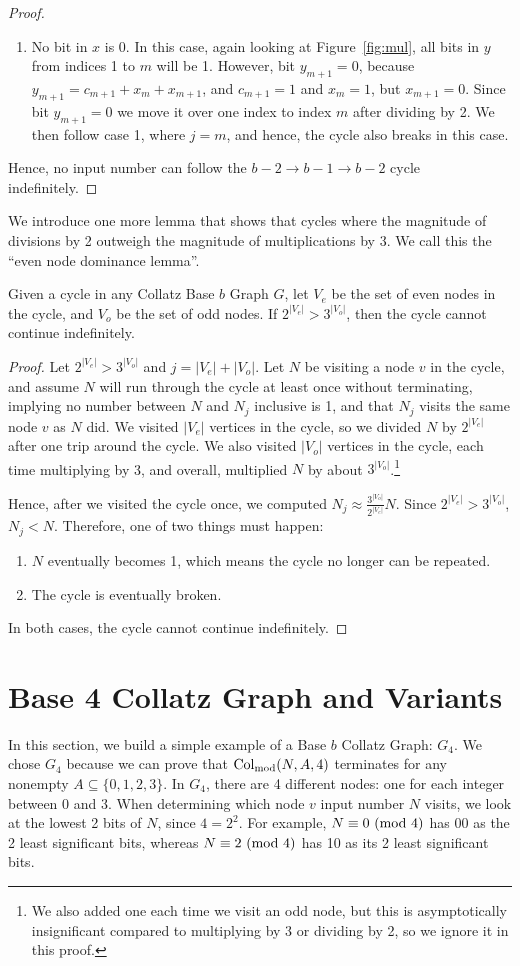 \begin{proof}
\begin{enumerate}
    \item No bit in $x$ is 0. In this case, again looking at Figure~\ref{fig:mul}, all bits in $y$ from indices 1 to $m$ will be 1. However, bit $y_{m+1} = 0$, because $y_{m+1} = c_{m+1} + x_{m} + x_{m+1}$, and $c_{m+1} = 1$ and $x_{m} = 1$, but $x_{m+1} = 0$. Since bit $y_{m+1} = 0$ we move it over one index to index $m$ after dividing by 2. We then follow case 1, where $j = m$, and hence, the cycle also breaks in this case.
 \end{enumerate}
 Hence, no input number can follow the $b-2 \rightarrow b-1 \rightarrow b-2$ cycle indefinitely. 
\end{proof}
We introduce one more lemma that shows that cycles where the magnitude of divisions by 2 outweigh the magnitude of multiplications by 3. We call this the ``even node dominance lemma''.
\begin{lemma}
\label{lem:EvenDom}
Given a cycle in any Collatz Base $b$ Graph $G$, let $V_{e}$ be the set of even nodes in the cycle, and $V_{o}$ be the set of odd nodes. If $2^{|V_e|} > 3^{|V_o|}$, then the cycle cannot continue indefinitely.
\end{lemma}
\begin{proof}
Let $2^{|V_e|} > 3^{|V_o|}$ and $j=|V_e| + |V_o|$. Let $N$ be visiting a node $v$ in the cycle, and assume $N$ will run through the cycle at least once without terminating, implying no number between $N$ and $N_j$ inclusive is 1, and that $N_j$ visits the same node $v$ as $N$ did. We visited $|V_e|$ vertices in the cycle, so we divided $N$ by $2^{|V_e|}$ after one trip around the cycle. We also visited $|V_o|$ vertices in the cycle, each time multiplying by 3, and overall, multiplied $N$ by about $3^{|V_o|}$.\footnote{We also added one each time we visit an odd node, but this is asymptotically insignificant compared to multiplying by 3 or dividing by 2, so we ignore it in this proof.}\par
Hence, after we visited the cycle once, we computed $N_{j} \approx \frac{3^{|V_o|}}{2^{|V_e|}}N$. Since $2^{|V_e|} > 3^{|V_o|}$, $N_{j} < N$. Therefore, one of two things must happen:
\begin{enumerate}
\item $N$ eventually becomes 1, which means the cycle no longer can be repeated.
\item The cycle is eventually broken.
\end{enumerate}
In both cases, the cycle cannot continue indefinitely.
\end{proof}
\section{Base 4 Collatz Graph and Variants} \label{subsec:base4graph}
In this section, we build a simple example of a Base $b$ Collatz Graph:  $G_4$. We chose $G_4$ because we can prove that $\mathrm{Col}_{\text{mod}}(N,A,4)$ terminates for any nonempty $A \subseteq \{0,1,2,3\}$. In $G_4$, there are 4 different nodes: one for each integer between 0 and 3. When determining which node $v$ input number $N$ visits, we look at the lowest 2 bits of $N$, since $4= 2^2$. For example, $N \equiv 0\ (\mathrm{mod}\ 4)$ has 00 as the 2 least significant bits, whereas $N \equiv 2\ (\mathrm{mod}\ 4)$ has 10 as its 2 least significant bits.
